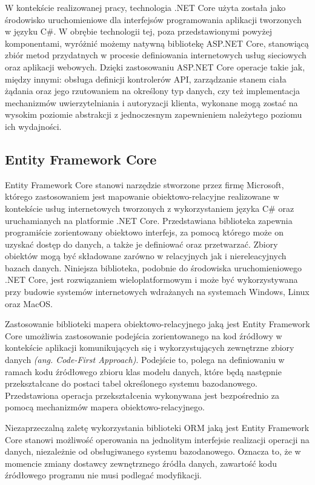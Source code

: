 W kontekście realizowanej pracy, technologia .NET Core użyta została jako środowisko uruchomieniowe dla interfejsów programowania aplikacji tworzonych w języku C\#. W obrębie technologii tej, poza przedstawionymi powyżej komponentami, wyróżnić możemy natywną bibliotekę ASP.NET Core, stanowiącą zbiór metod przydatnych w procesie definiowania internetowych usług sieciowych oraz aplikacji webowych. Dzięki zastosowaniu ASP.NET Core operacje takie jak, między innymi: obsługa definicji kontrolerów API, zarządzanie stanem ciała żądania oraz jego rzutowaniem na określony typ danych, czy też implementacja mechanizmów uwierzytelniania i autoryzacji klienta, wykonane mogą zostać na wysokim poziomie abstrakcji z jednoczesnym zapewnieniem należytego poziomu ich wydajności.
\subsection*{Entity Framework Core}
Entity Framework Core stanowi narzędzie stworzone przez firmę Microsoft, którego zastosowaniem jest mapowanie obiektowo-relacyjne realizowane w kontekście usług internetowych tworzonych z wykorzystaniem języka C\# oraz uruchamianych na platformie .NET Core. Przedstawiana biblioteka zapewnia programiście zorientowany obiektowo interfejs, za pomocą którego może on uzyskać dostęp do danych, a także je definiować oraz przetwarzać. Zbiory obiektów mogą być składowane zarówno w relacyjnych jak i niereleacyjnych bazach danych. Niniejsza biblioteka, podobnie do środowiska uruchomieniowego .NET Core, jest rozwiązaniem wieloplatformowym i może być wykorzystywana przy budowie systemów internetowych wdrażanych na systemach Windows, Linux oraz MacOS.

Zastosowanie biblioteki mapera obiektowo-relacyjnego jaką jest Entity Framework Core umożliwia zastosowanie podejścia zorientowanego na kod źródłowy w kontekście aplikacji komunikujących się i wykorzystujących zewnętrzne zbiory danych \textit{(ang. Code-First Approach)}. Podejście to, polega na definiowaniu w ramach kodu źródłowego zbioru klas modelu danych, które będą następnie przekształcane do postaci tabel określonego systemu bazodanowego. Przedstawiona operacja przekształcenia wykonywana jest bezpośrednio za pomocą mechanizmów mapera obiektowo-relacyjnego. 

Niezaprzeczalną zaletę wykorzystania biblioteki ORM jaką jest Entity Framework Core stanowi możliwość operowania na jednolitym interfejsie realizacji operacji na danych, niezależnie od obsługiwanego systemu bazodanowego. Oznacza to, że w momencie zmiany dostawcy zewnętrznego źródła danych, zawartość kodu źródłowego programu nie musi podlegać modyfikacji.
